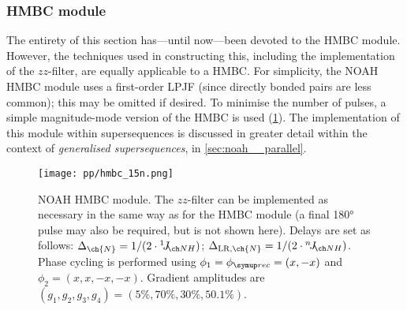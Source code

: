 \subsubsection{\nitrogen{} HMBC module}

The entirety of this section has---until now---been devoted to the \carbon{} HMBC module.
However, the techniques used in constructing this, including the implementation of the $zz$-filter, are equally applicable to a \nitrogen{} HMBC.
For simplicity, the NOAH \nitrogen{} HMBC module uses a first-order LPJF (since directly bonded  pairs are less common); this may be omitted if desired.
To minimise the number of pulses, a simple magnitude-mode version of the HMBC is used (\cref{fig:noah_15n_hmbc}).
The implementation of this module within supersequences is discussed in greater detail within the context of \textit{generalised supersequences}, in \cref{sec:noah__parallel}.

\begin{figure}[htb]
    \centering
    \texttt{[image: pp/hmbc\_15n.png]}%
    \caption[NOAH \nitrogen{} HMBC module]{
        NOAH \nitrogen{} HMBC module.
        The $zz$-filter can be implemented as necessary in the same way as for the \carbon{} HMBC module (a final \proton{} \ang{180} pulse may also be required, but is not shown here).
        Delays are set as follows: $\Delta_{\ch{N}} = 1 / (2 \cdot \oneJ{NH})$; $\Delta_{\text{LR},\ch{N}} = 1 / (2 \cdot \nJ{NH})$.
        Phase cycling is performed using $\phi_1 = \phirec = (x, -x)$ and $\phi_2 = (x, x, -x, -x)$.
        Gradient amplitudes are $(g_1, g_2, g_3, g_4) = (5\%, 70\%, 30\%, 50.1\%)$.
    }
    \label{fig:noah_15n_hmbc}
\end{figure}
